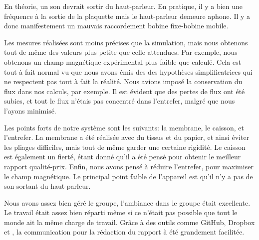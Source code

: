 

En théorie, un son devrait sortir du haut-parleur.  En pratique, il y a bien une fréquence
à la sortie de la plaquette mais le haut-parleur demeure aphone. Il y a donc manifestement 
un mauvais raccordement bobine fixe-bobine mobile.

Les mesures réalisées sont moins précises que la simulation, mais nous obtenons tout de même 
des valeurs plus petite que celle attendues.  Par exemple, nous obtenons un champ magnétique
expérimental plus faible que calculé.  Cela est tout à fait normal vu que nous avons émis des
des hypothèses simplificatrices qui ne respectent pas tout à fait la réalité. Nous avions 
imposé la conservation du flux dans nos calculs, par exemple. Il est évident que des pertes de flux 
ont été subies, et tout le flux n'étais pas concentré dans l'entrefer, malgré que nous l'ayons minimisé.

Les points forts de notre système sont les suivants: la membrane, le caisson, et l'entrefer. La membrane a 
été réalisée avec du tissus et du papier, et ainsi éviter les pliages difficiles, mais tout de même garder 
une certaine rigidité.  Le caisson est également un fierté, étant donné qu'il a été pensé pour obtenir le
meilleur rapport qualité-prix. Enfin, nous avons pensé à réduire l'entrefer, pour maximiser le champ magnétique.
Le principal point faible de l'appareil est qu'il n'y a pas de son sortant du haut-parleur.

Nous avons assez bien géré le groupe, l'ambiance dans le groupe était excellente.  Le travail était assez bien réparti
même si ce n'était pas possible que tout le monde ait la même charge de travail.  Grâce à des outils comme GitHub, Dropbox et 
\Latex, la communication pour la rédaction du rapport à été grandement facilitée.



